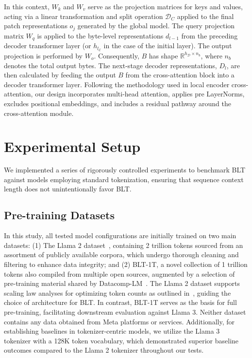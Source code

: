 In this context, $W_k$ and $W_v$ serve as the projection matrices for keys and values, acting via a linear transformation and split operation $\mathcal{D}_C$ applied to the final patch representations $o_j$ generated by the global model. The query projection matrix $W_q$ is applied to the byte-level representations $d_{l-1}$ from the preceding decoder transformer layer (or $h_{l_{\mathcal{E}}}$ in the case of the initial layer). The output projection is performed by $W_o$. Consequently, $B$ has shape $\mathbb{R}^{h_{\mathcal{D}} \times n_b}$, where $n_b$ denotes the total output bytes. The next-stage decoder representations, $D_l$, are then calculated by feeding the output $B$ from the cross-attention block into a decoder transformer layer. Following the methodology used in local encoder cross-attention, our design incorporates multi-head attention, applies pre LayerNorms, excludes positional embeddings, and includes a residual pathway around the cross-attention module.

\section{Experimental Setup}
\label{section:experiments}
We implemented a series of rigorously controlled experiments to benchmark {\textsc BLT} against models employing standard tokenization, ensuring that sequence context length does not unintentionally favor {\textsc BLT}.

\subsection{Pre-training Datasets} In this study, all tested model configurations are initially trained on two main datasets: (1) The Llama 2 dataset~\citep{touvron2023llama}, containing 2 trillion tokens sourced from an assortment of publicly available corpora, which undergo thorough cleaning and filtering to enhance data integrity; and (2) {\textsc BLT}-1T, a novel collection of 1 trillion tokens also compiled from multiple open sources, augmented by a selection of pre-training material shared by Datacomp-LM~\citep{li2024datacomp}. The Llama 2 dataset supports scaling law analyses for optimizing token counts as outlined in~\cite{dubey2024llama}, guiding the choice of architecture for {\textsc BLT}. In contrast, {\textsc BLT}-1T serves as the basis for full pre-training, facilitating downstream evaluation against Llama 3. Neither dataset contains any data obtained from Meta platforms or services. Additionally, for establishing baselines in tokenizer-centric models, we utilize the Llama 3 tokenizer with a 128K token vocabulary, which demonstrated superior baseline outcomes compared to the Llama 2 tokenizer throughout our tests.

